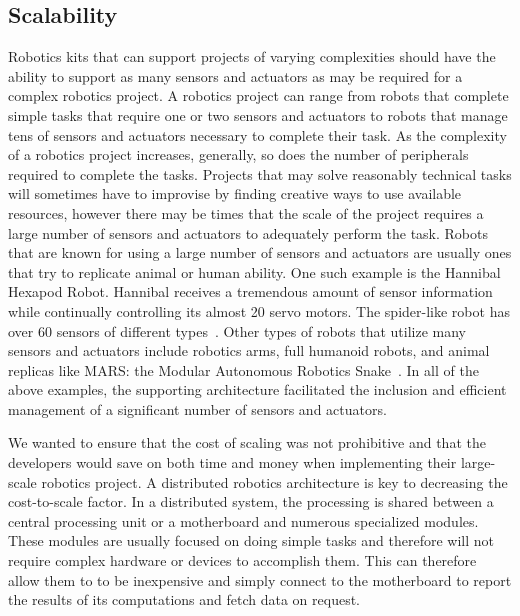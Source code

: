  

\subsection{Scalability} %
\label{sub:scalability}
Robotics kits that can support projects of varying complexities should have the ability to support as many sensors and actuators as may be required for a complex robotics project. A robotics project can range from robots that complete simple tasks that require one or two sensors and actuators to robots that manage tens of sensors and actuators necessary to complete their task. As the complexity of a robotics project increases, generally, so does the number of peripherals required to complete the tasks. Projects that may solve reasonably technical tasks will sometimes have to improvise by finding creative ways to use available resources, however there may be times that the scale of the project requires a large number of sensors and actuators to adequately perform the task. Robots that are known for using a large number of sensors and actuators are usually ones that try to replicate animal or human ability. One such example is the Hannibal Hexapod Robot. Hannibal receives a tremendous amount of sensor  information while continually controlling its almost 20 servo motors.  The spider-like robot has over 60 sensors of different types~\parencite{hannibal}. Other types of robots that utilize many sensors and actuators include robotics arms, full humanoid robots, and animal replicas like MARS: the Modular  Autonomous Robotics Snake~\parencite{mars}. In all of the above examples, the supporting architecture facilitated the inclusion and efficient management of a significant number of sensors and actuators.

 We wanted to ensure that the cost of scaling was not prohibitive and that the developers would save on both time and money when implementing their large-scale robotics project. A distributed robotics architecture is key to decreasing the cost-to-scale factor. In a distributed system, the processing is shared between a central processing unit or a motherboard and numerous specialized modules. These modules are usually focused on doing simple tasks and therefore will not require complex hardware or devices to accomplish them. This can therefore allow them to to be inexpensive and simply connect to the motherboard to report the results of its computations and fetch data on request.


